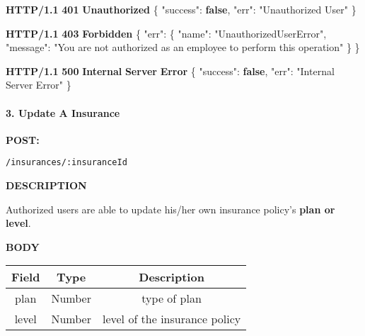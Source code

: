 \documentclass[
]{article}
\newenvironment{Shaded}{}{}
\newcommand{\DataTypeTok}[1]{\textcolor[rgb]{0.56,0.13,0.00}{#1}}
\newcommand{\ErrorTok}[1]{\textcolor[rgb]{1.00,0.00,0.00}{\textbf{#1}}}
\newcommand{\FunctionTok}[1]{\textcolor[rgb]{0.02,0.16,0.49}{#1}}
\newcommand{\KeywordTok}[1]{\textcolor[rgb]{0.00,0.44,0.13}{\textbf{#1}}}
\newcommand{\StringTok}[1]{\textcolor[rgb]{0.25,0.44,0.63}{#1}}
\begin{document}
\begin{Shaded}
\begin{Highlighting}[]
\ErrorTok{HTTP/1.1} \ErrorTok{401} \ErrorTok{Unauthorized}
\FunctionTok{\{}
    \DataTypeTok{"success"}\FunctionTok{:} \KeywordTok{false}\FunctionTok{,}
    \DataTypeTok{"err"}\FunctionTok{:} \StringTok{"Unauthorized User"}
\FunctionTok{\}}
\end{Highlighting}
\end{Shaded}

\begin{Shaded}
\begin{Highlighting}[]
\ErrorTok{HTTP/1.1} \ErrorTok{403} \ErrorTok{Forbidden}
\FunctionTok{\{}
    \DataTypeTok{"err"}\FunctionTok{:} \FunctionTok{\{}
        \DataTypeTok{"name"}\FunctionTok{:} \StringTok{"UnauthorizedUserError"}\FunctionTok{,}
        \DataTypeTok{"message"}\FunctionTok{:} \StringTok{"You are not authorized as an employee to perform this operation"}
    \FunctionTok{\}}
\FunctionTok{\}}
\end{Highlighting}
\end{Shaded}

\begin{Shaded}
\begin{Highlighting}[]
\ErrorTok{HTTP/1.1} \ErrorTok{500} \ErrorTok{Internal} \ErrorTok{Server} \ErrorTok{Error}
\FunctionTok{\{}
    \DataTypeTok{"success"}\FunctionTok{:} \KeywordTok{false}\FunctionTok{,}
    \DataTypeTok{"err"}\FunctionTok{:} \StringTok{"Internal Server Error"}
\FunctionTok{\}}
\end{Highlighting}
\end{Shaded}

\hypertarget{header-n706}{%
\paragraph{3. Update A Insurance}\label{header-n706}}

\textbf{POST:}

\begin{verbatim}
/insurances/:insuranceId
\end{verbatim}

\textbf{DESCRIPTION}

Authorized users are able to update his/her own insurance policy's
\textbf{plan or level}.

\textbf{BODY}

\begin{longtable}[]{@{}ccc@{}}
\toprule
Field & Type & Description\tabularnewline
\midrule
\endhead
plan & Number & type of plan\tabularnewline
level & Number & level of the insurance policy\tabularnewline
\bottomrule
\end{longtable}
\end{document}
